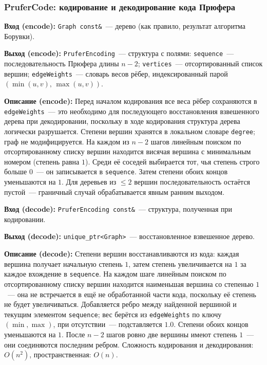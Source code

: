 \subsubsection{PruferCode: кодирование и декодирование кода Прюфера}

\textbf{Вход (encode):} \texttt{Graph const\&}~--- дерево (как правило,
результат алгоритма Борувки).

\textbf{Выход (encode):} \texttt{PruferEncoding}~--- структура с полями:
\texttt{sequence}~--- последовательность Прюфера длины $n-2$;
\texttt{vertices}~--- отсортированный список вершин;
\texttt{edgeWeights}~--- словарь весов рёбер, индексированный
парой $(\min(u,v),\, \max(u,v))$.

\textbf{Описание (encode):} Перед началом кодирования все веса рёбер
сохраняются в \texttt{edgeWeights}~--- это необходимо для последующего
восстановления взвешенного дерева при декодировании, поскольку в ходе
кодирования структура дерева логически разрушается. Степени вершин
хранятся в локальном словаре \texttt{degree}; граф не модифицируется.
На каждом из $n-2$ шагов линейным поиском по отсортированному списку
вершин находится висячая вершина с минимальным номером (степень равна
$1$). Среди её соседей выбирается тот, чья степень строго больше $0$~---
он записывается в \texttt{sequence}. Затем степени обоих концов
уменьшаются на $1$. Для деревьев из $\leq 2$ вершин последовательность
остаётся пустой~--- граничный случай обрабатывается явным ранним
выходом.

\textbf{Вход (decode):} \texttt{PruferEncoding const\&}~--- структура,
полученная при кодировании.

\textbf{Выход (decode):} \texttt{unique\_ptr<Graph>}~--- восстановленное
взвешенное дерево.

\textbf{Описание (decode):} Степени вершин восстанавливаются из кода:
каждая вершина получает начальную степень $1$, затем степень
увеличивается на $1$ за каждое вхождение в \texttt{sequence}. На
каждом шаге линейным поиском по отсортированному списку вершин
находится наименьшая вершина со степенью $1$~--- она не встречается
в ещё не обработанной части кода, поскольку её степень не будет
увеличиваться. Добавляется ребро между найденной вершиной и текущим
элементом \texttt{sequence}; вес берётся из \texttt{edgeWeights} по
ключу $(\min, \max)$, при отсутствии~--- подставляется $1.0$.
Степени обоих концов уменьшаются на $1$. После $n-2$ шагов ровно
две вершины имеют степень $1$~--- они соединяются последним ребром.
Сложность кодирования и декодирования: $O(n^2)$,
пространственная: $O(n)$.

